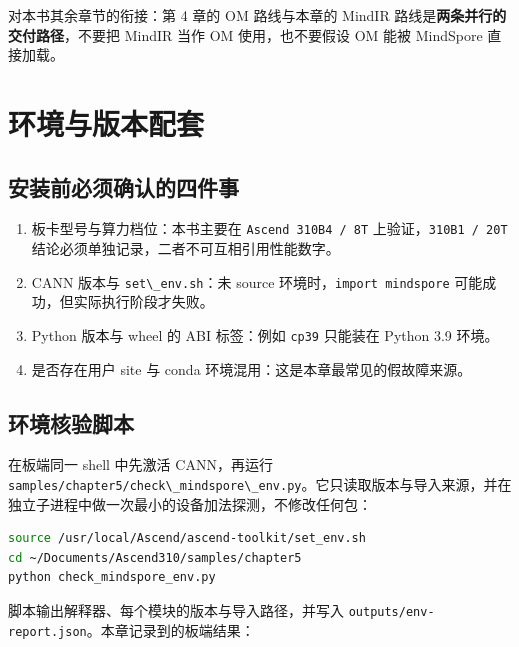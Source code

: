 对本书其余章节的衔接：第 4 章的 OM 路线与本章的 MindIR
路线是\textbf{两条并行的交付路径}，不要把 MindIR 当作 OM
使用，也不要假设 OM 能被 MindSpore 直接加载。

\section{环境与版本配套}\label{src-book-chapter5-h5}

\subsection{安装前必须确认的四件事}\label{src-book-chapter5-h6}

\begin{enumerate}
\def\labelenumi{\arabic{enumi}.}
\tightlist
\item
  板卡型号与算力档位：本书主要在
  \passthrough{\lstinline!Ascend 310B4 / 8T!}
  上验证，\passthrough{\lstinline!310B1 / 20T!}
  结论必须单独记录，二者不可互相引用性能数字。
\item
  CANN 版本与 \passthrough{\lstinline!set\_env.sh!}：未 source
  环境时，\passthrough{\lstinline!import mindspore!}
  可能成功，但实际执行阶段才失败。
\item
  Python 版本与 wheel 的 ABI 标签：例如 \passthrough{\lstinline!cp39!}
  只能装在 Python 3.9 环境。
\item
  是否存在用户 site 与 conda 环境混用：这是本章最常见的假故障来源。
\end{enumerate}

\subsection{环境核验脚本}\label{src-book-chapter5-h7}

在板端同一 shell 中先激活 CANN，再运行
\passthrough{\lstinline!samples/chapter5/check\_mindspore\_env.py!}。它只读取版本与导入来源，并在独立子进程中做一次最小的设备加法探测，不修改任何包：

\begin{lstlisting}[language=bash]
source /usr/local/Ascend/ascend-toolkit/set_env.sh
cd ~/Documents/Ascend310/samples/chapter5
python check_mindspore_env.py
\end{lstlisting}

脚本输出解释器、每个模块的版本与导入路径，并写入
\passthrough{\lstinline!outputs/env-report.json!}。本章记录到的板端结果：

